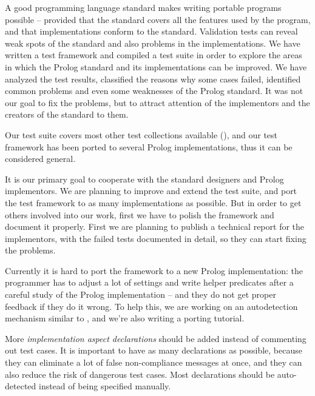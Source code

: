 \documentclass[draft]{llncs}%
\begin{document}
A good programming language standard makes writing portable programs
possible -- provided that the standard covers
 all the features used by the
program, and that implementations conform to the standard.
Validation tests can reveal weak spots of the standard and also problems
in the implementations.
We have written a test framework and compiled a test suite in order to
explore the areas in which the Prolog standard and its implementations can
be improved.
We have analyzed the test results, classified the reasons why some cases
failed, identified common problems and even some
weaknesses of the Prolog standard. It was not our goal to fix the problems,
but to attract attention of the implementors and the creators of the standard
to them.

Our test suite covers most other test collections available
(\cite{isoprolog95,executable,validation}),
and our test framework has been ported to several Prolog implementations,
thus it can be considered general.


It is our primary goal to cooperate with the standard designers and Prolog
implementors. We are planning to improve and extend the test suite, and port
the test framework to as many implementations as possible. But in order to
get others involved into our work, first we have to polish the framework and
document it properly. First we are planning to publish a technical report for
the implementors, with the failed tests documented in detail, so they can
start fixing the problems.

Currently it is hard to port the framework to a new Prolog implementation:
the programmer has to adjust a lot of settings and write helper predicates
after a careful study of the Prolog implementation -- and they do not get
proper feedback if they do it wrong. To help this, we are working on an
autodetection mechanism similar to , and we're also
writing a porting tutorial.

More \emph{implementation aspect declarations} should be added instead of
commenting out test cases. It is important to have as many declarations as
possible, because they can eliminate a lot of false non-compliance messages at
once, and they can also reduce the risk of dangerous test cases.
Most declarations should be auto-detected instead of being specified manually.
\end{document}
